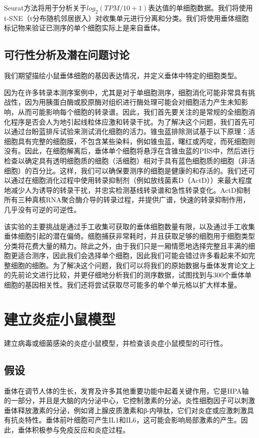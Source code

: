   Seurat方法将用于分析关于$log_{2}(TPM/10+1)$表达值的单细胞数据。我们将使用t-SNE（t分布随机邻居嵌入）对收集单元进行分离和分类。我们将使用垂体细胞标记物来验证已测序的单个细胞实际上是来自垂体。

\subsection{可行性分析及潜在问题讨论}
  我们期望描绘小鼠垂体细胞的基因表达情况，并定义垂体中特定的细胞类型。

  因为在许多转录本测序案例中，尤其是对于单细胞测序，细胞消化可能非常具有挑战性，因为用胰蛋白酶或胶原酶对组织进行酶处理可能会对细胞活力产生未知影响，从而可能影响每个细胞的转录谱。因此，我们首先要关注的是常规的全细胞消化程序是否会人为地引起线粒体应激和转录干扰。为了解决这个问题，我们首先可以通过台盼蓝排斥试验来测试消化细胞的活力。锥虫蓝排除测试基于以下原理：活细胞具有完整的细胞膜，不包含某些染料，例如锥虫蓝，曙红或丙啶，而死细胞则没有。因此，在细胞解离后，垂体单个细胞将悬浮在含锥虫蓝的PBS中，然后进行检查以确定具有透明细胞质的细胞（活细胞）相对于具有蓝色细胞质的细胞（非活细胞）的百分比。这样，我们可以确保要测序的细胞是健康的和存活的。我们还可以通过在细胞消化过程中使用转录抑制剂（例如放线菌素D（ActD））来最大程度地减少人为诱导的转录干扰，并忠实检测基线转录谱和急性转录变化。ActD抑制所有三种真核RNA聚合酶介导的转录过程，并提供广谱，快速的转录抑制作用，几乎没有可逆的可逆性。

  该实验的主要挑战是通过手工收集可获取的垂体细胞数量有限，以及通过手工收集垂体细胞引起的潜在偏倚。细胞捕获非常耗时，并且获取足够的细胞用于细胞类型分类将花费大量的精力。除此之外，由于我们只是一厢情愿地选择完整且丰满的细胞更适合测序，因此我们会选择单个细胞，因此我们可能会错过许多看起来不如完整细胞的细胞。为了解决这个问题，我们可以将我们的原始数据与垂体发育论文上的先前论文进行比较，并更仔细地分析我们的测序数据，试图找到与300个垂体单细胞的基因相关性。我们还将尝试获取尽可能多的单个单元格以扩大样本量。

\section{建立炎症小鼠模型}
  建立病毒或细菌感染的炎症小鼠模型，并检查该炎症小鼠模型的可行性。
\subsection{假设}
  垂体在调节人体的生长，发育及许多其他重要功能中起着关键作用，它是HPA轴的一部分，并且是大脑的内分泌中心，它控制激素的分泌。炎性细胞因子可以刺激垂体释放激素的分泌，例如肾上腺皮质激素和β-内啡肽，它们对炎症或应激刺激具有抗炎特性。垂体前叶细胞可产生IL1和IL6，这可能会影响局部激素的产生。因此，垂体积极参与免疫反应和炎症过程。

